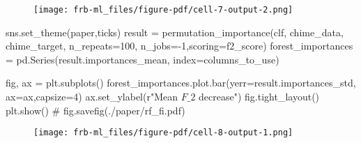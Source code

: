 \documentclass[
  letterpaper,
  DIV=11,
  numbers=noendperiod]{scrartcl}
\newenvironment{Shaded}{\begin{snugshade}}{\end{snugshade}}
\newcommand{\CommentTok}[1]{\textcolor[rgb]{0.37,0.37,0.37}{#1}}
\newcommand{\DecValTok}[1]{\textcolor[rgb]{0.68,0.00,0.00}{#1}}
\newcommand{\NormalTok}[1]{\textcolor[rgb]{0.00,0.23,0.31}{#1}}
\newcommand{\OperatorTok}[1]{\textcolor[rgb]{0.37,0.37,0.37}{#1}}
\newcommand{\StringTok}[1]{\textcolor[rgb]{0.13,0.47,0.30}{#1}}
\newcommand{\VerbatimStringTok}[1]{\textcolor[rgb]{0.13,0.47,0.30}{#1}}
\begin{document}
\begin{figure}[H]

{\centering \texttt{[image: frb-ml\_files/figure-pdf/cell-7-output-2.png]}

}

\end{figure}

\begin{Shaded}
\begin{Highlighting}[]
\NormalTok{sns.set\_theme(}\StringTok{\textquotesingle{}paper\textquotesingle{}}\NormalTok{,}\StringTok{\textquotesingle{}ticks\textquotesingle{}}\NormalTok{)}
\NormalTok{result }\OperatorTok{=}\NormalTok{ permutation\_importance(clf, chime\_data, chime\_target, n\_repeats}\OperatorTok{=}\DecValTok{100}\NormalTok{, n\_jobs}\OperatorTok{={-}}\DecValTok{1}\NormalTok{,scoring}\OperatorTok{=}\NormalTok{f2\_score)}
\NormalTok{forest\_importances }\OperatorTok{=}\NormalTok{ pd.Series(result.importances\_mean, index}\OperatorTok{=}\NormalTok{columns\_to\_use)}

\NormalTok{fig, ax }\OperatorTok{=}\NormalTok{ plt.subplots()}
\NormalTok{forest\_importances.plot.bar(yerr}\OperatorTok{=}\NormalTok{result.importances\_std, ax}\OperatorTok{=}\NormalTok{ax,capsize}\OperatorTok{=}\DecValTok{4}\NormalTok{)}
\NormalTok{ax.set\_ylabel(}\VerbatimStringTok{r"Mean $F\_2$ decrease"}\NormalTok{)}
\NormalTok{fig.tight\_layout()}
\NormalTok{plt.show()}
\CommentTok{\# fig.savefig(\textquotesingle{}./paper/rf\_fi.pdf\textquotesingle{})}
\end{Highlighting}
\end{Shaded}

\begin{figure}[H]

{\centering \texttt{[image: frb-ml\_files/figure-pdf/cell-8-output-1.png]}

}

\end{figure}
\end{document}
